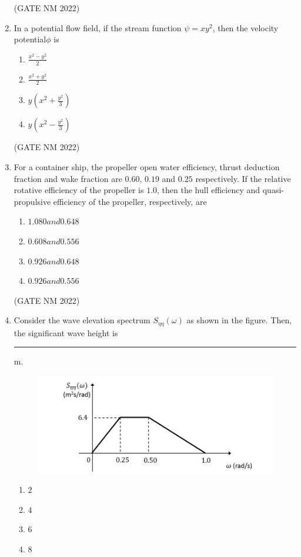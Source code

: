 \documentclass[journal,12pt,onecolumn]{IEEEtran}
\theoremstyle{remark}
\begin{document}
\begin{enumerate}
\hfill(GATE NM 2022)

\item  In a potential flow field, if the stream function $\psi = x y^2$, then the velocity potential$\phi$ is
	\begin{multicols}{2}
\begin{enumerate}
	\item $\frac{x^2 - y^2}{2} $
	\item $\frac{x^2 + y^2}{2} $
	\item $y(x^2 + \frac{y^2}{3}) $
	\item $y(x^2 - \frac{y^2}{3}) $
\end{enumerate}
	\end{multicols}

\hfill(GATE NM 2022)

\item  For a container ship, the propeller open water efficiency, thrust deduction fraction and wake fraction are $0.60$, $0.19$ and $0.25$ respectively.  
If the relative rotative efficiency of the propeller is $1.0$, then the hull efficiency and quasi-propulsive efficiency of the propeller, respectively, are
\begin{multicols}{2}
\begin{enumerate}
    \item $1.080 and 0.648$
    \item $0.608 and 0.556$
    \item $0.926 and 0.648$
    \item $0.926 and 0.556$
\end{enumerate}
\end{multicols}

\hfill(GATE NM 2022)

\item  Consider the wave elevation spectrum $S_{\eta\eta}(\omega)$ as shown in the figure.  
	Then, the significant wave height is \rule{3cm}{0.15mm}  m.
\begin{figure}[h]
    \centering
	\includegraphics[width=0.3\columnwidth]{fig5}
	\caption{}
	\label{fig:placeholder}
\end{figure}
\begin{multicols}{4}
\begin{enumerate}
    \item $2$
    \item $4$
    \item $6$
    \item $8$
\end{enumerate}
\end{multicols}


\end{enumerate}
\end{document}

